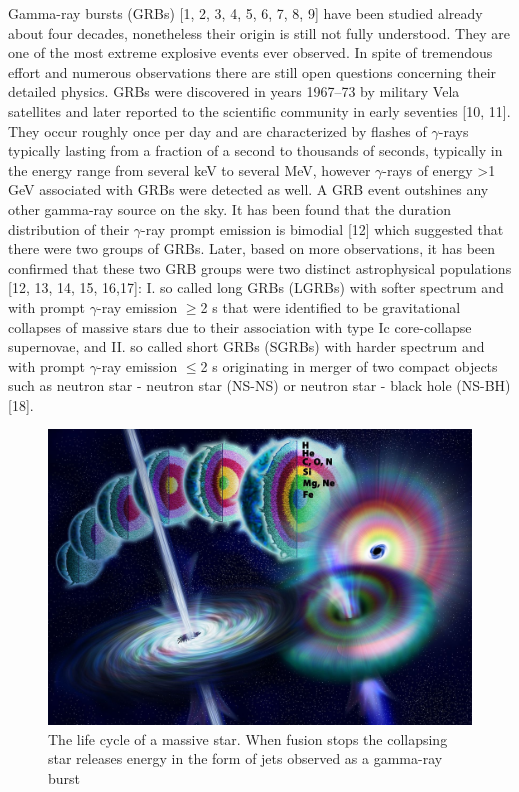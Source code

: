 \documentclass[12pt, a4paper,titlepage]{article}
\numberwithin{equation}{section}
\numberwithin{figure}{section}
\begin{document}
Gamma-ray bursts (GRBs) [1, 2, 3, 4, 5, 6, 7, 8, 9] have been studied already about four decades, nonetheless their origin is still not fully understood. They are one of the most extreme explosive events ever observed. In spite of tremendous effort and numerous observations there are still open questions concerning their detailed physics. GRBs were discovered in years 1967–73 by military Vela satellites and later reported to the scientific community in early seventies [10, 11]. They occur roughly once per day and are characterized by flashes of $\gamma$-rays typically lasting from a fraction of a second to thousands of seconds, typically in the energy range from several keV to several MeV, however $\gamma$-rays of energy >1 GeV associated with GRBs were detected as well. A GRB event outshines any other gamma-ray source on the sky.
It has been found that the duration distribution of their $\gamma$-ray prompt emission is bimodial [12] which suggested that there were two groups of GRBs. Later, based on more observations, it has been confirmed that these two GRB groups were two distinct astrophysical populations [12, 13, 14, 15, 16,17]: I. so called long GRBs (LGRBs) with softer spectrum and with prompt $\gamma$-ray emission $\geqslant$2 s that were identified to be gravitational collapses of massive stars due to their association with type Ic core-collapse supernovae, and II. so called short GRBs (SGRBs) with harder spectrum and with prompt $\gamma$-ray emission $\leqslant$2 s originating in merger of two compact objects such as neutron star - neutron star (NS-NS) or neutron star - black hole (NS-BH) [18].


\begin{figure}[H]
\centering
\includegraphics[width=130.0mm]{images/Gamma_ray_burst.jpg}
\caption{The life cycle of a massive star. When fusion stops the collapsing star releases energy in the form of jets observed as a gamma-ray burst}
\end{figure}
\end{document}

